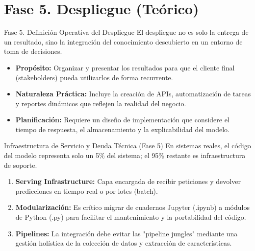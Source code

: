 \documentclass{beamer}
\begin{document}
	\section{Fase 5. Despliegue (Teórico)}
	\begin{frame}{Fase 5. Definición Operativa del Despliegue}
		El despliegue no es solo la entrega de un resultado, sino la integración del conocimiento descubierto en un entorno de toma de decisiones.
		
		\begin{itemize}
			\item<2-> \textbf{Propósito:} Organizar y presentar los resultados para que el cliente final (stakeholders) pueda utilizarlos de forma recurrente.
			\item<3-> \textbf{Naturaleza Práctica:} Incluye la creación de APIs, automatización de tareas y reportes dinámicos que reflejen la realidad del negocio.
			\item<4-> \textbf{Planificación:} Requiere un diseño de implementación que considere el tiempo de respuesta, el almacenamiento y la explicabilidad del modelo.
		\end{itemize}
	\end{frame}
	
	\begin{frame}{Infraestructura de Servicio y Deuda Técnica (Fase 5)}
		En sistemas reales, el código del modelo representa solo un 5\% del sistema; el 95\% restante es infraestructura de soporte.
		
		\begin{enumerate}
			\item<2-> \textbf{Serving Infrastructure:} Capa encargada de recibir peticiones y devolver predicciones en tiempo real o por lotes (batch).
			\item<3-> \textbf{Modularización:} Es crítico migrar de cuadernos Jupyter (.ipynb) a módulos de Python (.py) para facilitar el mantenimiento y la portabilidad del código.
			\item<4-> \textbf{Pipelines:} La integración debe evitar las "pipeline jungles" mediante una gestión holística de la colección de datos y extracción de características.
		\end{enumerate}
	\end{frame}
	
\end{document}
